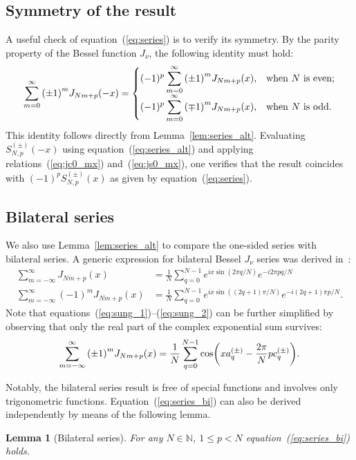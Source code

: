 \documentclass{article}
\newtheorem{lemma}[theorem]{Lemma}
\begin{document}
\subsection{Symmetry of the result}
A useful check of equation~(\ref{eq:series}) is to verify its symmetry.
By the parity property of the Bessel function $J_{\nu}$, the following identity must hold:
\begin{equation}
\sum_{m=0}^{\infty} \qty(\pm 1)^m J_{Nm+p}(-x) = \begin{cases}
\displaystyle (-1)^p \sum_{m=0}^{\infty} \qty(\pm 1)^m J_{Nm+p}(x), & \text{when $N$ is even;}\\
\displaystyle (-1)^p \sum_{m=0}^{\infty} \qty(\mp 1)^m J_{Nm+p}(x), & \text{when $N$ is odd.}\\
\end{cases}
\end{equation}
This identity follows directly from Lemma~\ref{lem:series_alt}.
Evaluating $S^{(\pm)}_{N,p}(-x)$ using equation~(\ref{eq:series_alt}) and applying relations~(\ref{eq:jc0_mx}) and~(\ref{eq:js0_mx}), one verifies that the result coincides with $(-1)^p S^{(\pm)}_{N,p}(x)$ as given by equation~(\ref{eq:series}).

\subsection{Bilateral series}
We also use Lemma~\ref{lem:series_alt} to compare the one-sided series with bilateral series.
A generic expression for bilateral Bessel $J_\nu$ series was derived in~\cite{Sung2022}:
\begin{align}
\label{eq:sung_1}
\sum_{m=-\infty}^{\infty} J_{N m+p}(x) &= \frac{1}{N}\sum_{q=0}^{N-1} e^{ix\sin(2\pi q/N)}e^{-i2\pi pq/N }\\
\label{eq:sung_2}
\sum_{m=-\infty}^{\infty} (-1)^m J_{N m+p}(x) &= \frac{1}{N} \sum_{q=0}^{N-1}e^{ix\sin((2q+1)\pi/N)}e^{-i(2q+1)\pi p/N}.
\end{align}
Note that equations~(\ref{eq:sung_1})--(\ref{eq:sung_2}) can be further simplified by observing that only the real part of the complex exponential sum survives:
\begin{equation}
\label{eq:series_bi}
\sum_{m=-\infty}^{\infty} \qty(\pm 1)^m J_{N m+p}(x) = \frac{1}{N}\sum_{q=0}^{N-1} \cos(x a^{(\pm)}_q - \frac{2\pi}{N} p c^{(\pm)}_q).
\end{equation}

Notably, the bilateral series result is free of special functions and involves only trigonometric functions.
Equation~(\ref{eq:series_bi}) can also be derived independently by means of the following lemma.
\begin{lemma}[Bilateral series]
\label{lem:series_bi}
For any $N \in \mathbb{N}$, $1 \le p < N$ equation~(\ref{eq:series_bi}) holds.
\end{lemma}
\end{document}
